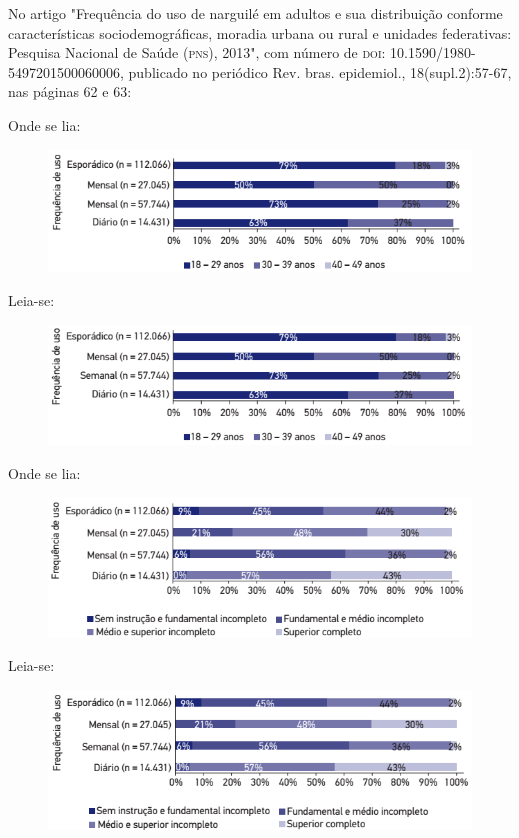 \documentclass{article}
\begin{document}
No artigo "Frequência do uso de narguilé em adultos e sua distribuição conforme
características sociodemográficas, moradia urbana ou rural e unidades
federativas: Pesquisa Nacional de Saúde (\textsc{pns}), 2013", com número de \textsc{doi}:
10.1590/1980-5497201500060006, publicado no periódico Rev. bras. epidemiol.,
18(supl.2):57-67, nas páginas 62 e 63:

Onde se lia:

\begin{figure}
\includegraphics[width=\textwidth]{1980-5497-rbepid-19-02-00469-gf1.png}
\caption{}\label{fig:f1}
\end{figure}

Leia-se:

\begin{figure}
\includegraphics[width=\textwidth]{1980-5497-rbepid-19-02-00469-gf2.png}
\caption{}\label{fig:f2}
\end{figure}

Onde se lia:

\begin{figure}
\includegraphics[width=\textwidth]{1980-5497-rbepid-19-02-00469-gf3.png}
\caption{}\label{fig:f3}
\end{figure}

Leia-se:

\begin{figure}
\includegraphics[width=\textwidth]{1980-5497-rbepid-19-02-00469-gf4.png}
\caption{}\label{fig:f4}
\end{figure}
\end{document}
